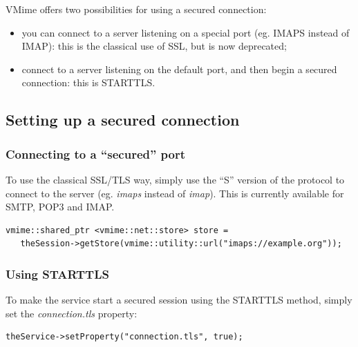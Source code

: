 
VMime offers two possibilities for using a secured connection:

\begin{itemize}
\item you can connect to a server listening on a special port (eg. IMAPS
instead of IMAP): this is the classical use of SSL, but is now deprecated;
\item connect to a server listening on the default port, and then begin a
secured connection: this is STARTTLS.
\end{itemize}


\subsection{Setting up a secured connection} %

\subsubsection{Connecting to a ``secured'' port} %

To use the classical SSL/TLS way, simply use the ``S'' version of the protocol
to connect to the server (eg. \emph{imaps} instead of \emph{imap}). This is
currently available for SMTP, POP3 and IMAP.

\begin{lstlisting}
vmime::shared_ptr <vmime::net::store> store =
   theSession->getStore(vmime::utility::url("imaps://example.org"));
\end{lstlisting}

\subsubsection{Using STARTTLS} %

To make the service start a secured session using the STARTTLS method, simply
set the \emph{connection.tls} property:

\begin{lstlisting}
theService->setProperty("connection.tls", true);
\end{lstlisting}

